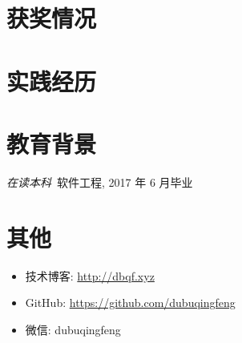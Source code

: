 \documentclass{resume}
\begin{document}
\section{获奖情况}

\section{实践经历}

\section{教育背景}
\textit{在读本科}\ 软件工程,  2017 年 6 月毕业

\section{其他}
\begin{itemize}[parsep=0.5ex]
  \item 技术博客: \href{http://dbqf.xyz}{http://dbqf.xyz}
  \item GitHub: \href{https://github.com/dubuqingfeng}{https://github.com/dubuqingfeng}
  \item 微信: dubuqingfeng
\end{itemize}
\end{document}
